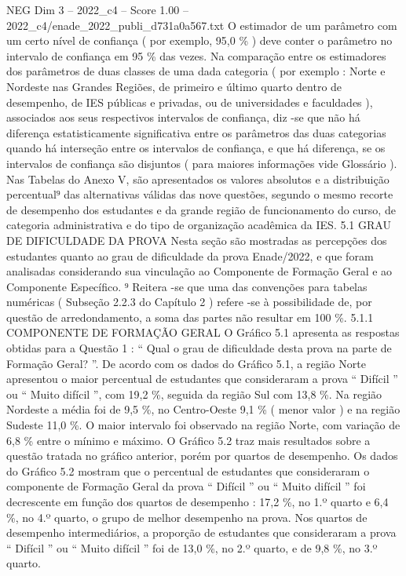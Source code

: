 \begin{textsample}{NEG Dim 3 – 2022\_c4 – Score 1.00 – 2022\_c4/enade\_2022\_publi\_d731a0a567.txt}
O estimador de um parâmetro com um certo nível de confiança ( por exemplo, 95,0 \% ) deve conter o parâmetro no intervalo de confiança em 95 \% das vezes.
Na comparação entre os estimadores dos parâmetros de duas classes de uma dada categoria ( por exemplo : Norte e Nordeste nas Grandes Regiões, de primeiro e último quarto dentro de desempenho, de IES públicas e privadas, ou de universidades e faculdades ), associados aos seus respectivos intervalos de confiança, diz -se que não há diferença estatisticamente significativa entre os parâmetros das duas categorias quando há interseção entre os intervalos de confiança, e que há diferença, se os intervalos de confiança são disjuntos ( para maiores informações vide Glossário ).
Nas Tabelas do Anexo V, são apresentados os valores absolutos e a distribuição percentual⁹ das alternativas válidas das nove questões, segundo o mesmo recorte de desempenho dos estudantes e da grande região de funcionamento do curso, de categoria administrativa e do tipo de organização acadêmica da IES. 5.1 GRAU DE DIFICULDADE DA PROVA Nesta seção são mostradas as percepções dos estudantes quanto ao grau de dificuldade da prova Enade/2022, e que foram analisadas considerando sua vinculação ao Componente de Formação Geral e ao Componente Específico. ⁹ Reitera -se que uma das convenções para tabelas numéricas ( Subseção 2.2.3 do Capítulo 2 ) refere -se à possibilidade de, por questão de arredondamento, a soma das partes não resultar em 100 \%. 5.1.1 COMPONENTE DE FORMAÇÃO GERAL O Gráfico 5.1 apresenta as respostas obtidas para a Questão 1 : “ Qual o grau de dificuldade desta prova na parte de Formação Geral? ”.
De acordo com os dados do Gráfico 5.1, a região Norte apresentou o maior percentual de estudantes que consideraram a prova “ Difícil ” ou “ Muito difícil ”, com 19,2 \%, seguida da região Sul com 13,8 \%.
Na região Nordeste a média foi de 9,5 \%, no Centro-Oeste 9,1 \% ( menor valor ) e na região Sudeste 11,0 \%.
O maior intervalo foi observado na região Norte, com variação de 6,8 \% entre o mínimo e máximo.
O Gráfico 5.2 traz mais resultados sobre a questão tratada no gráfico anterior, porém por quartos de desempenho.
Os dados do Gráfico 5.2 mostram que o percentual de estudantes que consideraram o componente de Formação Geral da prova “ Difícil ” ou “ Muito difícil ” foi decrescente em função dos quartos de desempenho : 17,2 \%, no 1.º quarto e 6,4 \%, no 4.º quarto, o grupo de melhor desempenho na prova.
Nos quartos de desempenho intermediários, a proporção de estudantes que consideraram a prova “ Difícil ” ou “ Muito difícil ” foi de 13,0 \%, no 2.º quarto, e de 9,8 \%, no 3.º quarto.

\end{textsample}
